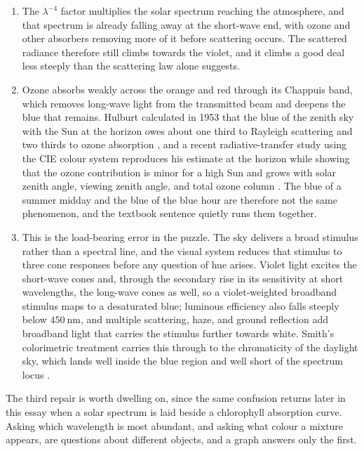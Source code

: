 \begin{enumerate}[label=\textbf{\arabic*.}]
  \item {} The $\lambda^{-4}$ factor multiplies the solar spectrum reaching the atmosphere, and that spectrum is already falling away at the short-wave end, with ozone and other absorbers removing more of it before scattering occurs. The scattered radiance therefore still climbs towards the violet, and it climbs a good deal less steeply than the scattering law alone suggests.

  \item {} Ozone absorbs weakly across the orange and red through its Chappuis band, which removes long-wave light from the transmitted beam and deepens the blue that remains. Hulburt calculated in 1953 that the blue of the zenith sky with the Sun at the horizon owes about one third to Rayleigh scattering and two thirds to ozone absorption \citep{hulburt1953}, and a recent radiative-transfer study using the CIE colour system reproduces his estimate at the horizon while showing that the ozone contribution is minor for a high Sun and grows with solar zenith angle, viewing zenith angle, and total ozone column \citep{lange2023}. The blue of a summer midday and the blue of the blue hour are therefore not the same phenomenon, and the textbook sentence quietly runs them together.

  \item {} This is the load-bearing error in the puzzle. The sky delivers a broad stimulus rather than a spectral line, and the visual system reduces that stimulus to three cone responses before any question of hue arises. Violet light excites the short-wave cones and, through the secondary rise in its sensitivity at short wavelengths, the long-wave cones as well, so a violet-weighted broadband stimulus maps to a desaturated blue; luminous efficiency also falls steeply below $450\ \mathrm{nm}$, and multiple scattering, haze, and ground reflection add broadband light that carries the stimulus further towards white. Smith's colorimetric treatment carries this through to the chromaticity of the daylight sky, which lands well inside the blue region and well short of the spectrum locus \citep{smith2005}.
\end{enumerate}

The third repair is worth dwelling on, since the same confusion returns later in this essay when a solar spectrum is laid beside a chlorophyll absorption curve. Asking which wavelength is most abundant, and asking what colour a mixture appears, are questions about different objects, and a graph answers only the first.

